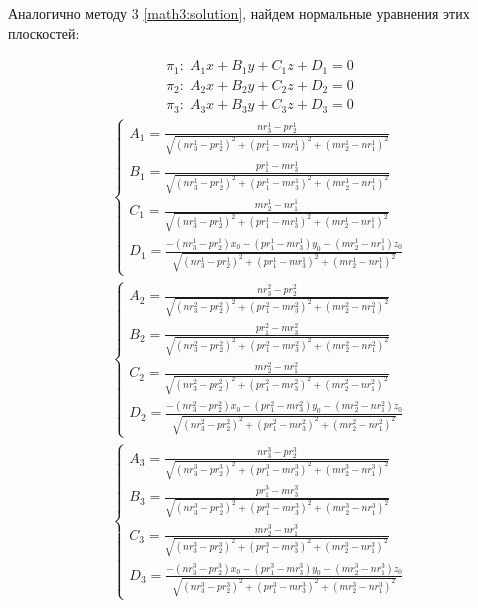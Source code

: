 Аналогично методу 3 \ref{math3:solution}, найдем нормальные уравнения этих плоскостей:

$$\begin{gathered}
	\pi_1: \; A_1 x + B_1 y + C_1 z + D_1 = 0 \\
	\pi_2: \; A_2 x + B_2 y + C_2 z + D_2 = 0 \\
	\pi_3: \; A_3 x + B_3 y + C_3 z + D_3 = 0
\end{gathered}$$
$$\begin{gathered}
	\begin{cases}
		A_1 = \frac{n r_3^1 - p r_2^1}{\sqrt{(n r_3^1 - p r_2^1)^2 + (p r_1^1 - m r_3^1)^2 + (m r_2^1 - n r_1^1)^2}} \\
		B_1 = \frac{p r_1^1 - m r_3^1}{\sqrt{(n r_3^1 - p r_2^1)^2 + (p r_1^1 - m r_3^1)^2 + (m r_2^1 - n r_1^1)^2}} \\
		C_1 = \frac{m r_2^1 - n r_1^1}{\sqrt{(n r_3^1 - p r_2^1)^2 + (p r_1^1 - m r_3^1)^2 + (m r_2^1 - n r_1^1)^2}} \\
		D_1 = \frac{- (n r_3^1 - p r_2^1) x_0 - (p r_1^1 - m r_3^1) y_0 - (m r_2^1 - n r_1^1) z_0}{\sqrt{(n r_3^1 - p r_2^1)^2 + (p r_1^1 - m r_3^1)^2 + (m r_2^1 - n r_1^1)^2}}
	\end{cases} \\
	\begin{cases}
		A_2 = \frac{n r_3^2 - p r_2^2}{\sqrt{(n r_3^2 - p r_2^2)^2 + (p r_1^2 - m r_3^2)^2 + (m r_2^2 - n r_1^2)^2}} \\
		B_2 = \frac{p r_1^2 - m r_3^2}{\sqrt{(n r_3^2 - p r_2^2)^2 + (p r_1^2 - m r_3^2)^2 + (m r_2^2 - n r_1^2)^2}} \\
		C_2 = \frac{m r_2^2 - n r_1^2}{\sqrt{(n r_3^2 - p r_2^2)^2 + (p r_1^2 - m r_3^2)^2 + (m r_2^2 - n r_1^2)^2}} \\
		D_2 = \frac{- (n r_3^2 - p r_2^2) x_0 - (p r_1^2 - m r_3^2) y_0 - (m r_2^2 - n r_1^2) z_0}{\sqrt{(n r_3^2 - p r_2^2)^2 + (p r_1^2 - m r_3^2)^2 + (m r_2^2 - n r_1^2)^2}}
	\end{cases} \\
	\begin{cases}
		A_3 = \frac{n r_3^3 - p r_2^3}{\sqrt{(n r_3^3 - p r_2^3)^2 + (p r_1^3 - m r_3^3)^2 + (m r_2^3 - n r_1^3)^2}} \\
		B_3 = \frac{p r_1^3 - m r_3^3}{\sqrt{(n r_3^3 - p r_2^3)^2 + (p r_1^3 - m r_3^3)^2 + (m r_2^3 - n r_1^3)^2}} \\
		C_3 = \frac{m r_2^3 - n r_1^3}{\sqrt{(n r_3^3 - p r_2^3)^2 + (p r_1^3 - m r_3^3)^2 + (m r_2^3 - n r_1^3)^2}} \\
		D_3 = \frac{- (n r_3^3 - p r_2^3) x_0 - (p r_1^3 - m r_3^3) y_0 - (m r_2^3 - n r_1^3) z_0}{\sqrt{(n r_3^3 - p r_2^3)^2 + (p r_1^3 - m r_3^3)^2 + (m r_2^3 - n r_1^3)^2}}
	\end{cases}
\end{gathered}$$

